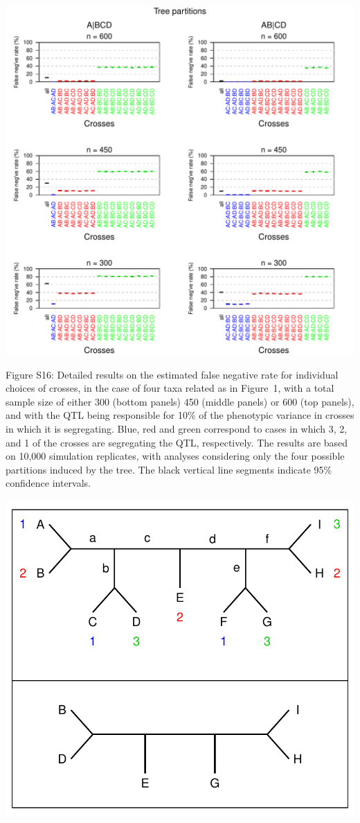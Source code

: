 \documentclass[letterpaper,twoside]{article}
\begin{document}
{\centering
\includegraphics{SuppFigs/detailedns_treepart.pdf}}

\bigskip \noindent
Figure S16: Detailed results on the estimated false negative rate for individual
  choices of crosses, in the case of four taxa related as in Figure~1,
  with a total sample size of either 300 (bottom panels) 450 (middle
  panels) or 600 (top panels), and with the QTL being responsible
  for 10\% of the phenotypic variance in crosses in which it is
  segregating. Blue, red and green correspond to cases in which 3, 2,
  and 1 of the crosses are segregating the QTL, respectively.  The
  results are based on 10,000 simulation replicates, with analyses
  considering only the four possible partitions induced by the tree.
  The black vertical line segments indicate 95\% confidence intervals.


\newpage

\centerline{\includegraphics{SuppFigs/supp_tree_fig.pdf}}
\end{document}
